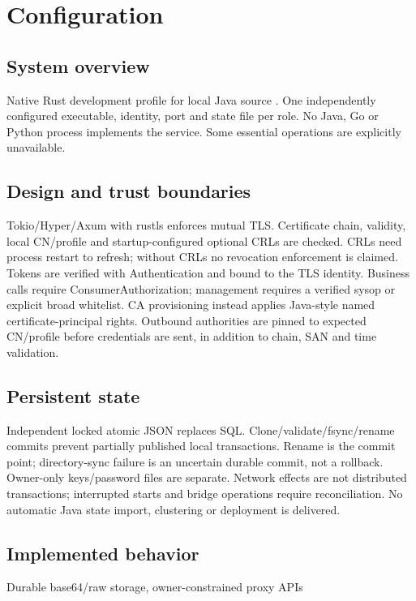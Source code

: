 \documentclass[a4paper]{arrowhead}
\begin{document}
\ArrowheadSetup
\section{Configuration}
\subsection{System overview}
Native Rust development profile for local Java source . One independently configured executable, identity, port and state file per role. No Java, Go or Python process implements the service. Some essential operations are explicitly unavailable.
\subsection{Design and trust boundaries}
Tokio/Hyper/Axum with rustls enforces mutual TLS. Certificate chain, validity, local CN/profile and startup-configured optional CRLs are checked. CRLs need process restart to refresh; without CRLs no revocation enforcement is claimed. Tokens are verified with Authentication and bound to the TLS identity. Business calls require ConsumerAuthorization; management requires a verified sysop or explicit broad whitelist. CA provisioning instead applies Java-style named certificate-principal rights. Outbound authorities are pinned to expected CN/profile before credentials are sent, in addition to chain, SAN and time validation.
\subsection{Persistent state}
Independent locked atomic JSON replaces SQL. Clone/validate/fsync/rename commits prevent partially published local transactions. Rename is the commit point; directory-sync failure is an uncertain durable commit, not a rollback. Owner-only keys/password files are separate. Network effects are not distributed transactions; interrupted starts and bridge operations require reconciliation. No automatic Java state import, clustering or deployment is delivered.
\subsection{Implemented behavior}
Durable base64/raw storage, owner-constrained proxy APIs
\end{document}
